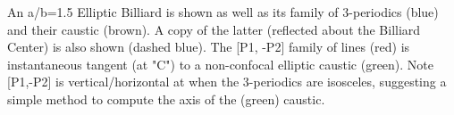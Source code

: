 An a/b=1.5 Elliptic Billiard is shown as well as its family of  3-periodics (blue) and their caustic (brown). A copy of the latter (reflected about the Billiard Center) is also shown (dashed blue). The [P1, -P2] family of lines (red) is instantaneous tangent (at "C") to a non-confocal elliptic caustic (green). Note [P1,-P2] is vertical/horizontal at when the 3-periodics are isosceles, suggesting a simple method to compute the axis of the (green) caustic.